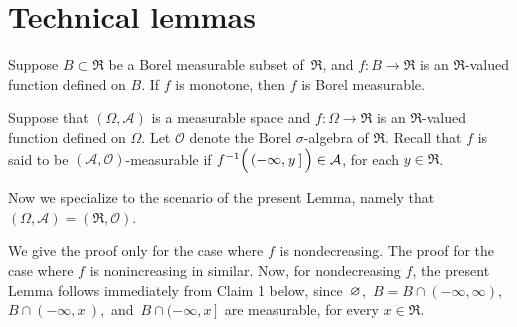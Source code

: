 

\section{Technical lemmas}
\setcounter{theorem}{0}
\setcounter{equation}{0}


\renewcommand{\theenumi}{\roman{enumi}}
\renewcommand{\labelenumi}{\textnormal{(\theenumi)}$\;\;$}


\begin{lemma}\label{lemma:MonotoneFunctionsAreMeasurable}
\mbox{}\vskip 0.1cm
\noindent
Suppose $B \subset \Re$ be a Borel measurable subset of \,$\Re$, and
$f : B \longrightarrow \Re$ is an $\Re$-valued function defined on $B$.
If $f$ is monotone, then $f$ is Borel measurable.
\end{lemma}
\proof
Suppose that $(\Omega,\mathcal{A})$ is a measurable space and
$f : \Omega \longrightarrow \Re$ is an $\Re$-valued function defined on $\Omega$.
Let $\mathcal{O}$ denote the Borel $\sigma$-algebra of $\Re$.
Recall that $f$ is said to be $(\mathcal{A},\mathcal{O})$-measurable if
$f^{-1}\!\left(\,(-\infty,\overset{{\color{white}-}}{y}\,]\,\right) \in \mathcal{A}$,
for each $y \in \Re$.

\vskip 0.3cm
\noindent
Now we specialize to the scenario of the present Lemma, namely that
$(\Omega,\mathcal{A}) = (\Re,\mathcal{O})$.

\vskip 0.3cm
\noindent
We give the proof only for the case where $f$ is nondecreasing.
The proof for the case where $f$ is nonincreasing in similar.
Now, for nondecreasing $f$, the present Lemma follows immediately
from Claim 1 below, since \,$\varnothing$, \,$B = B \cap (-\infty,\infty)$,
\,$B \cap (-\infty,x\,)$,\, and \,$B \cap (-\infty,x\,]$\, are measurable, for every $x\in\Re$.


